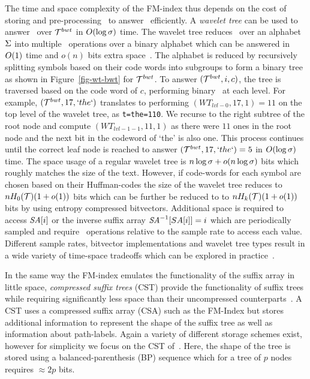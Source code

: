 The time and space complexity of the FM-index thus depends on the cost of storing
and pre-processing \colbwt\ to answer \rankop\ efficiently. A {\it wavelet tree}
can be used to answer \rankop\ over $\mathcal{T}^{bwt}$ in $O(\log \sigma)$ time.
The wavelet tree reduces \rankop\ over an alphabet $\Sigma$ into multiple
\rankop\ operations over a binary alphabet which can be answered 
in $O(1)$ time and $o(n)$ bits extra space~\cite{m-fsttcs96}. The alphabet is
reduced by recursively splitting symbols based on their code words into subgroups to 
form a binary tree as shown in Figure~\ref{fig-wt-bwt} for $\mathcal{T}^{bwt}$. To answer
\rankop$(\mathcal{T}^{bwt},i,c)$, the tree is traversed based on the code word of $c$, performing
binary \rankop\ at each level. For example, \rankop$(\mathcal{T}^{bwt},17,`the`)$ translates
to performing \rankop$(WT_{lvl-0},17,1)=11$ on the top level of the wavelet 
tree, as {\tt t=the=110}. We recurse to the right subtree of the root node and
compute \rankop$(WT_{lvl-1-1},11,1)$ as there were $11$ ones in the root node and
the next bit in the codeword of `the' is also one. This process continues until 
the correct leaf node is reached to answer \rankop$(\mathcal{T}^{bwt},17,`the`)=5$ in 
$O(\log \sigma)$ time. The space usage of a regular wavelet tree is
$n \log \sigma + o(n \log \sigma)$ bits which roughly
matches the size of the text. However, if code-words for each symbol are chosen
based on their Huffman-codes the size of the wavelet tree reduces to $nH_0(\mathcal{T})(1 + o(1))$
bits which can be further be reduced to to $nH_k(\mathcal{T})(1 + o(1))$ bits by using 
entropy compressed bitvectors. Additional space is required to access $\mbox{\emph{SA}}[i]$
or the inverse suffix array $\mbox{\emph{SA}}^{-1}[SA[i]]=i$ which are periodically sampled
and require \rankop\ operations relative to the sample rate to access each value.
Different sample rates, bitvector implementations and wavelet tree types result
in a wide variety of time-space tradeoffs which can be explored 
in practice~\cite{gbmp2014sea}.

In the same way the FM-index emulates the functionality of the suffix array in
little space, {\it compressed suffix trees} (CST) provide the functionality
of suffix trees while requiring significantly less space than their uncompressed
counterparts~\cite{ofg-spire10}. A CST uses a compressed suffix array (CSA) such
as the FM-Index but stores additional information to represent the shape of
the suffix tree as well as information about path-labels. Again a variety
of different storage schemes exist, however for simplicity we focus on
the CST of~. Here, the shape of the tree
is stored using a balanced-parenthesis (BP) sequence which for a tree of $p$ nodes
requires $\approx 2p$ bits.